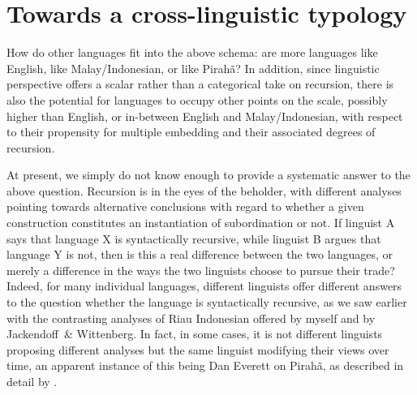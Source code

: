 \documentclass[output=paper]{langscibook}
\begin{document}
\section{Towards a cross-linguistic typology}\largerpage

How do other languages fit into the above schema: are more languages like English, like Malay\slash Indonesian, or like Pirahã?  In addition, since linguistic perspective offers a scalar rather than a categorical take on recursion, there is also the potential for languages to occupy other points on the scale, possibly higher than English, or in-between English and Malay\slash Indonesian, with respect to their propensity for multiple embedding and their associated degrees of recursion.

At present, we simply do not know enough to provide a systematic answer to the above question.  Recursion is in the eyes of the beholder, with different analyses pointing towards alternative conclusions with regard to whether a given construction constitutes an instantiation of subordination or not.  If linguist A says that language X is syntactically recursive, while linguist B argues that language Y is not, then is this a real difference between the two languages, or merely a difference in the ways the two linguists choose to pursue their trade?  Indeed, for many individual languages, different linguists offer different answers to the question whether the language is syntactically recursive, as we saw earlier with the contrasting analyses of Riau Indonesian offered by myself and by Jackendoff~\& Wittenberg. In fact, in some cases, it is not different linguists proposing different analyses but the same linguist modifying their views over time, an apparent instance of this being Dan Everett on Pirahã, as described in detail by .
\end{document}
